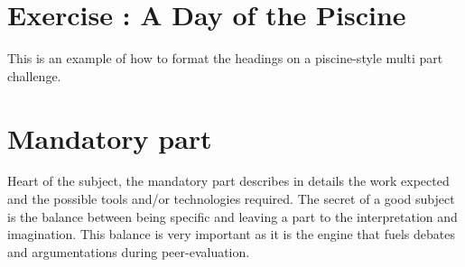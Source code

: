 \documentclass{42-en}
\begin{document}
\startexercices


\chapter{Exercise \exercicenumber: A Day of the Piscine}

\exnumber{\exercicenumber}

\makeheaderfiles

    This is an example of how to format the headings on a piscine-style multi part
    challenge.

\nextexercice

\chapter{Mandatory part}

    Heart of the subject, the mandatory part describes in details the
    work expected and the possible tools and/or technologies
    required. The secret of a good subject is the balance between
    being specific and leaving a part to the interpretation and
    imagination. This balance is very important as it is the engine
    that fuels debates and argumentations during peer-evaluation.



\end{document}

